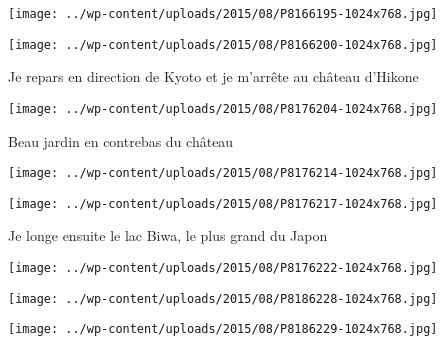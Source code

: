 \begin{center} \texttt{[image: ../wp-content/uploads/2015/08/P8166195-1024x768.jpg]} \end{center}

 

 

\begin{center} \texttt{[image: ../wp-content/uploads/2015/08/P8166200-1024x768.jpg]} \end{center}

 

 Je repars en direction de Kyoto et je m'arrête au château d'Hikone 

 

\begin{center} \texttt{[image: ../wp-content/uploads/2015/08/P8176204-1024x768.jpg]} \end{center}

 

 Beau jardin en contrebas du château 

 

\begin{center} \texttt{[image: ../wp-content/uploads/2015/08/P8176214-1024x768.jpg]} \end{center}

 

 

\begin{center} \texttt{[image: ../wp-content/uploads/2015/08/P8176217-1024x768.jpg]} \end{center}

 

 Je longe ensuite le lac Biwa, le plus grand du Japon 

 

\begin{center} \texttt{[image: ../wp-content/uploads/2015/08/P8176222-1024x768.jpg]} \end{center}

 

 

\begin{center} \texttt{[image: ../wp-content/uploads/2015/08/P8186228-1024x768.jpg]} \end{center}

 

 

\begin{center} \texttt{[image: ../wp-content/uploads/2015/08/P8186229-1024x768.jpg]} \end{center}


